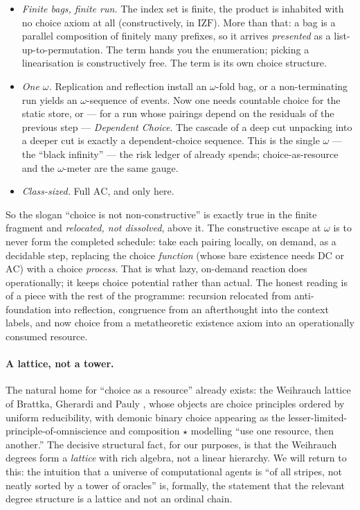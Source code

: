 \begin{itemize}[leftmargin=1.4em]
\item \emph{Finite bags, finite run.} The index set is finite, the product is
inhabited with no choice axiom at all (constructively, in $\mathrm{IZF}$). More
than that: a bag is a parallel composition of finitely many prefixes, so it
arrives \emph{presented} as a list-up-to-permutation. The term hands you the
enumeration; picking a linearisation is constructively free. The term is its own
choice structure.

\item \emph{One $\omega$.} Replication and reflection install an $\omega$-fold
bag, or a non-terminating run yields an $\omega$-sequence of events. Now one needs
countable choice for the static store, or --- for a run whose pairings depend on
the residuals of the previous step --- \emph{Dependent Choice}. The cascade of a
deep cut unpacking into a deeper cut \cite{paths} is exactly a dependent-choice
sequence. This is the single $\omega$ --- the ``black infinity'' --- the risk
ledger of \cite{qcs} already spends; choice-as-resource and the $\omega$-meter
are the same gauge.

\item \emph{Class-sized.} Full $\mathrm{AC}$, and only here.
\end{itemize}

\noindent
So the slogan ``choice is not non-constructive'' is exactly true in the finite
fragment and \emph{relocated, not dissolved}, above it. The constructive escape
at $\omega$ is to never form the completed schedule: take each pairing locally, on
demand, as a decidable step, replacing the choice \emph{function} (whose bare
existence needs $\mathrm{DC}$ or $\mathrm{AC}$) with a choice \emph{process}. That
is what lazy, on-demand reaction does operationally; it keeps choice potential
rather than actual. The honest reading is of a piece with the rest of the
programme: recursion relocated from anti-foundation into reflection, congruence
from an afterthought into the context labels, and now choice from a metatheoretic
existence axiom into an operationally consumed resource.

\paragraph{A lattice, not a tower.}
The natural home for ``choice as a resource'' already exists: the Weihrauch
lattice of Brattka, Gherardi and Pauly \cite{weihrauch}, whose objects are
choice principles ordered by uniform reducibility, with demonic binary choice
appearing as the lesser-limited-principle-of-omniscience and composition
$\star$ modelling ``use one resource, then another.'' The decisive structural
fact, for our purposes, is that the Weihrauch degrees form a \emph{lattice} with
rich algebra, not a linear hierarchy. We will return to this: the intuition that
a universe of computational agents is ``of all stripes, not neatly sorted by a
tower of oracles'' is, formally, the statement that the relevant degree structure
is a lattice and not an ordinal chain.


